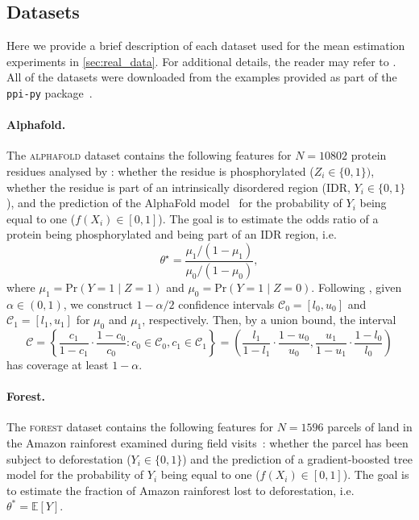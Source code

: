 \subsection{Datasets}\label{app:datasets}
Here we provide a brief description of each dataset used for the mean estimation experiments in \cref{sec:real_data}. For additional details, the reader may refer to \citet{Angelopoulos2023}. All of the datasets were downloaded from the examples provided as part of the \texttt{ppi-py} package~\citep{Angelopoulos2023a}.

\paragraph{Alphafold.}
The \textsc{alphafold} dataset contains the following features for $N = 10802$ protein residues analysed by \citet{Bludau2022}: whether the residue is phosphorylated ($Z_i \in \{0,1\})$, whether the residue is part of an intrinsically disordered region (IDR, $Y_i \in \{0,1\}$), and the prediction of the AlphaFold model~\citep{Jumper2021} for the probability of $Y_i$ being equal to one ($f(X_i) \in [0,1]$). The goal is to estimate the odds ratio of a protein being phosphorylated and being part of an IDR region, i.e.
\begin{equation*}
    \theta^\star = \frac{\mu_1 / (1 - \mu_1)}{\mu_0 / (1 - \mu_0)},
\end{equation*}
where $\mu_1 = \mathrm{Pr}(Y = 1 \mid Z = 1)$ and $\mu_0 = \mathrm{Pr}(Y = 1 \mid Z = 0)$. Following \citet{Angelopoulos2023}, given $\alpha \in (0, 1)$, we construct $1 -
\alpha / 2$ confidence intervals $\mathcal{C}_0 = [l_0, u_0]$ and $\mathcal{C}_1 = [l_1, u_1]$ for $\mu_0$ and $\mu_1$, respectively. Then, by a union bound, the interval
\begin{equation*}
    \mathcal{C} = \left\{\frac{c_1}{1 - c_1} \cdot \frac{1 - c_0}{c_0} \colon c_0 \in \mathcal{C}_0, c_1 \in \mathcal{C}_1 \right\} = \left(\frac{l_1}{1 - l_1} \cdot \frac{1 - u_0}{u_0}, \frac{u_1}{1 - u_1} \cdot \frac{1 - l_0}{l_0}\right)
\end{equation*}
has coverage at least $1 - \alpha$.

\paragraph{Forest.}
The \textsc{forest} dataset contains the following features for $N = 1596$ parcels of land in the Amazon rainforest examined during field visits~\citep{Bullock2020}: whether the parcel has been subject to deforestation ($Y_i \in \{0, 1\}$) and the prediction of a gradient-boosted tree model for the probability of $Y_i$ being equal to one ($f(X_i) \in [0, 1]$). The goal is to estimate the fraction of Amazon rainforest lost to deforestation, i.e.~$\theta^* = \mathbb{E}[Y]$.


